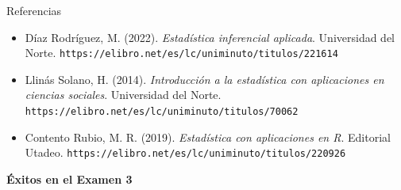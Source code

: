 \documentclass[aspectratio=169,10pt]{beamer}
\begin{document}
\begin{frame}{Referencias}
  \footnotesize
  \begin{itemize}
    \item[{[1]}] Díaz Rodríguez, M. (2022). \textit{Estadística inferencial
      aplicada}. Universidad del Norte.
      \texttt{https://elibro.net/es/lc/uniminuto/titulos/221614}
    \item[{[2]}] Llinás Solano, H. (2014). \textit{Introducción a la
      estadística con aplicaciones en ciencias sociales}. Universidad del
      Norte. \texttt{https://elibro.net/es/lc/uniminuto/titulos/70062}
    \item[{[3]}] Contento Rubio, M. R. (2019). \textit{Estadística con
      aplicaciones en R}. Editorial Utadeo.
      \texttt{https://elibro.net/es/lc/uniminuto/titulos/220926}
  \end{itemize}

  \vspace{0.3cm}
  \begin{center}
    {\Large\color{uniAzul}\textbf{Éxitos en el Examen 3}}
  \end{center}
\end{frame}
\end{document}
